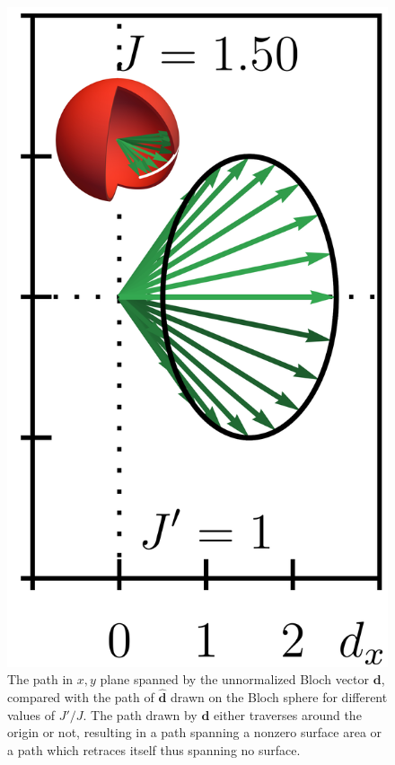 \begin{figure}[ht]
    \includegraphics{figures/ssh_unnormalized_winding_6.png}
    \caption{The path in $x,y$ plane spanned by the unnormalized Bloch vector $\bm d$, compared with the path of $\hat{\bm d}$ drawn on the Bloch sphere for different values of $J'/J$. The path drawn by $\bm d$ either traverses around the origin or not, resulting in a path spanning a nonzero surface area or a path which retraces itself thus spanning no surface.}
    \label{fig:ssh_winding_easy}
\end{figure}


